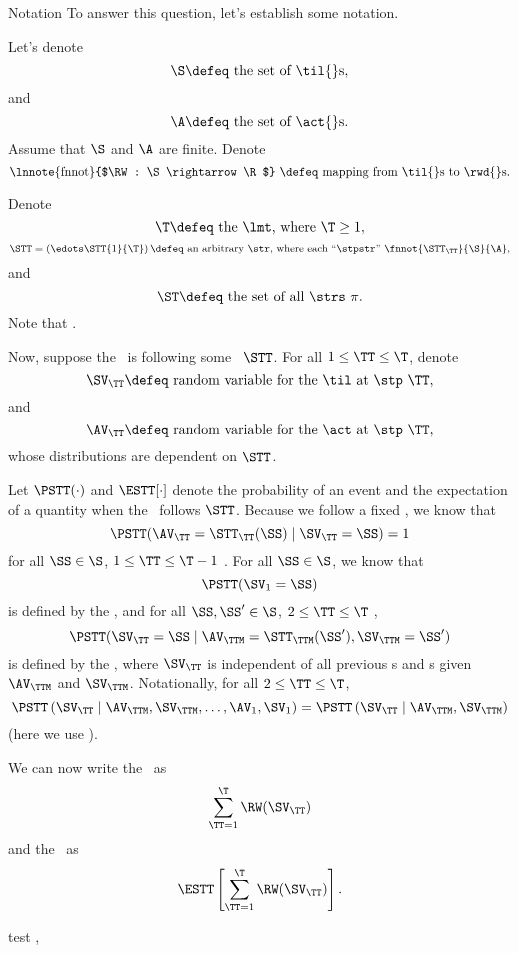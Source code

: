 \begin{part}{Notation}
  To answer this question, let's establish some notation.

  Let's denote
  $$\text{$\S \defeq$ the set of \til{}s},$$
  and 
  $$\text{$\A \defeq$ the set of \act{}s.}$$
  Assume that $\S$ and $\A$ are finite.
  Denote
  $$\text{\lnnote{fnnot}{$\RW : \S \rightarrow \R$} $\defeq$ mapping from \til{}s to \rwd{}s.}$$

  Denote
  $$\text{$\T \defeq$ the \lmt, where $\T \ge 1$},$$
  $$\text{$\STT = \left(\edots\STT{1}{\T}\right) \defeq$ an arbitrary \str, 
  where each ``\stpstr'' {$\fnnot{\STT_\TT}{\S}{\A}$}},$$
  and
  $$\text{$\ST \defeq$ the set of all \strs\ $\pi$}.$$
  Note that .

  Now, suppose the \agt\ is following some \str\ $\STT$.
  For all $1 \le \TT \le \T$,
  denote
  $$\text{$\SV_\TT \defeq$ random variable for the \til\ at \stp\ $\TT$},$$
  and
  $$\text{$\AV_\TT \defeq$ random variable for the \act\ at \stp\ $\TT$},$$
  whose distributions are dependent on $\STT$.

  Let $\PSTT(\cdot)$ and $\ESTT[\cdot]$ denote the probability of an event
  and the expectation of a quantity
  when the \agt\ follows $\STT$.
  Because we follow a fixed \str, we know that
  $$\PSTT(\AV_\TT = \STT_\TT(\SS) \mid \SV_\TT = \SS) = 1$$
  for all
  $\SS \in \S$, $1 \le \TT \le \T - 1$
  .
  For all $\SS \in \S$, we know that
  $$\PSTT(\SV_1 = \SS)$$
  is defined by the \ind, and
  for all $\SS, \SS' \in \S$, $2 \le \TT \le \T$ 
  ,
  $$\PSTT(\SV_\TT = \SS \mid \AV_\TTM = \STT_\TTM(\SS'), \SV_\TTM = \SS')$$
  is defined by the \trd, where 
  $\SV_\TT$ is independent of all previous \til{}s and \act{}s given $\AV_\TTM$ and $\SV_\TTM$.
  Notationally, for all $2 \le \TT \le \T$,
  $$ 
  \PSTT\left( \SV_\TT \mid \AV_{\TTM}, \SV_{\TTM}, \ldots, \AV_{1}, \SV_{1} \right)
  = 
  \PSTT\left( \SV_\TT \mid \AV_{\TTM}, \SV_{\TTM}\right)
  $$
  (here we use ).

  We can now write the \trwd\ as
  $$\sum_{\TT = 1}^\T \RW(\SV_\TT)$$
  and the \atrwd\ as
  $$\ESTT\left[\sum_{\TT = 1}^\T \RW(\SV_\TT)\right].$$

	\newpage
  test ,
\end{part}
